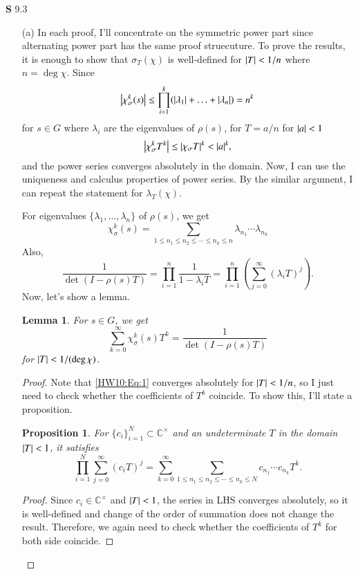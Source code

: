 \documentclass[a4paper, 12pt]{article}
\theoremstyle{Mydefinition}
\theoremstyle{Mytheorem}
\newtheorem{proposition}[statement]{Proposition}
\newtheorem{lemma}[statement]{Lemma}
\begin{document}
\noindent \textbf{S} 9.3
\begin{enumerate}
    \item[(a)] In each proof, I'll concentrate on the symmetric power part since alternating power part has the same proof struecuture. To prove the results, it is enough to show that $\sigma_T(\chi)$ is well-defined for $\abs{T}<1/n$ where $n=\deg \chi$. Since 
    \begin{equation}
        \abs{\chi^k_\sigma(s)}\leq \prod_{i=1}^k (\abs{\lambda_1}+\ldots +\abs{\lambda_n}) = n^k
    \end{equation}
    for $s\in G$ where $\lambda_i$ are the eigenvalues of $\rho(s)$, for $T=a/n$ for $\abs{a}<1$
\begin{equation}
    \abs{\chi_\sigma^k T^k}\leq \abs{\chi_\sigma T}^k< \abs{a}^k,
\end{equation}
and the power series converges absolutely in the domain. Now, I can use the uniqueness and calculus properties of power series. By the similar argument, I can repeat the statement for $\lambda_T(\chi)$.

For eigenvalues $\{\lambda_1, \ldots, \lambda_n\}$ of $\rho(s)$, we get
\begin{equation}\label{HW10:Eq:6}
    \chi_\sigma^k(s) = \sum_{1\leq n_1\leq n_2\leq \cdots\leq n_k\leq n}\lambda_{n_1}\cdots \lambda_{n_k}
\end{equation}
Also,
\begin{equation}\label{HW10:Eq:1}
    \frac{1}{\det(I-\rho(s)T)} = \prod_{i=1}^n\frac{1}{1-\lambda_iT} = \prod_{i=1}^n\left(\sum_{j=0}^\infty (\lambda_iT)^j\right).
\end{equation}
Now, let's show a lemma.
\begin{lemma}
    For $s\in G$, we get
    \begin{equation}\label{HW10:Eq:2}
        \sum_{k=0}^\infty \chi_\sigma^k(s) T^k = \frac{1}{\det(I-\rho(s)T)}
    \end{equation}
    for $\abs{T}<1/(\deg \chi)$.
\end{lemma}
\begin{proof}
Note that \eqref{HW10:Eq:1} converges absolutely for $\abs{T}<1/n$, so I just need to check whether the coefficients of $T^k$ coincide. To show this, I'll state a proposition.
\begin{proposition}
For $\{c_i\}_{i=1}^N\subset \mathbb{C}^\times$ and an undeterminate $T$ in the domain $\abs{T}<1$, it satisfies
\begin{equation}\label{HW10:Eq:4}
    \prod_{i=1}^N\sum_{j=0}^\infty (c_iT)^j = \sum_{k=0}^\infty \sum_{1\leq n_1\leq n_2\leq \cdots\leq n_k\leq N}c_{n_1}\cdots c_{n_k}T^k.
\end{equation}
\end{proposition}
\begin{proof}
Since $c_i\in\mathbb{C}^\times$ and $\abs{T}<1$, the series in LHS converges absolutely, so it is well-defined and change of the order of summation does not change the result. Therefore, we again need to check whether the coefficients of $T^k$ for both side coincide.


\end{proof}
\end{proof}
\end{enumerate}
\end{document}
